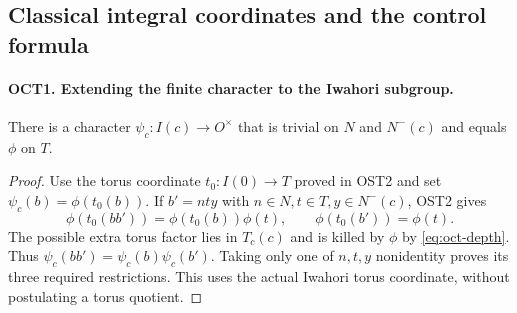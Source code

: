 \documentclass[11pt,a4paper]{article}
\numberwithin{equation}{section}
\theoremstyle{remark}\newtheorem{remark}[theorem]{Remark}
\begin{document}
\subsection{Classical integral coordinates and the control formula}

\paragraph{OCT1. Extending the finite character to the Iwahori subgroup.}
\label{claim:OCT1}
There is a character $\psi_c:I(c)\to O^\times$ that is trivial
on $N$ and $N^-(c)$ and equals $\phi$ on $T$.
\begin{proof}
Use the torus coordinate $t_0:I(0)\to T$ proved in OST2 and set
$\psi_c(b)=\phi(t_0(b))$.  If $b'=nty$ with
$n\in N,\allowbreak{} t\in T,\allowbreak{} y\in N^-(c)$, OST2 gives
\[
 \phi(t_0(bb'))=\phi(t_0(b))\phi(t),\qquad
 \phi(t_0(b'))=\phi(t).
\]
The possible extra torus factor lies in $T_c(c)$ and is killed by
$\phi$ by \eqref{eq:oct-depth}.  Thus $\psi_c(bb')=
\psi_c(b)\psi_c(b')$.  Taking only one of $n,\allowbreak{} t,\allowbreak{} y$ nonidentity
proves its three required restrictions.  This uses the actual
Iwahori torus coordinate, without postulating a torus quotient.
\end{proof}

\end{document}
